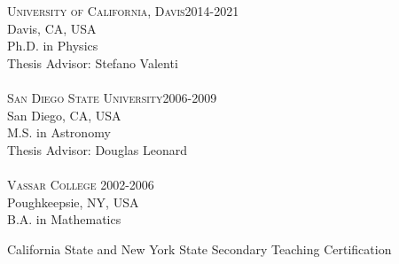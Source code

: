 \documentclass[10pt]{cv}
\begin{document}
\begin{llist}
\vspace{-0.2in}   
\textsc{University of California, Davis}\hfill 2014-2021\\
Davis, CA, USA \\
Ph.D. in Physics \\
Thesis Advisor: Stefano Valenti \\
\\
\textsc{San Diego State University}\hfill 2006-2009\\
San Diego, CA, USA \\
M.S. in Astronomy \\
Thesis Advisor: Douglas Leonard \\
\\
\textsc{Vassar College} \hfill 2002-2006 \\
Poughkeepsie, NY, USA \\
B.A. in Mathematics \\
\begin{minipage}[l]{0.7\textwidth}\vspace{0.15cm}
California State and New York State Secondary Teaching Certification \\
\end{minipage}


\end{llist}
\end{document}
